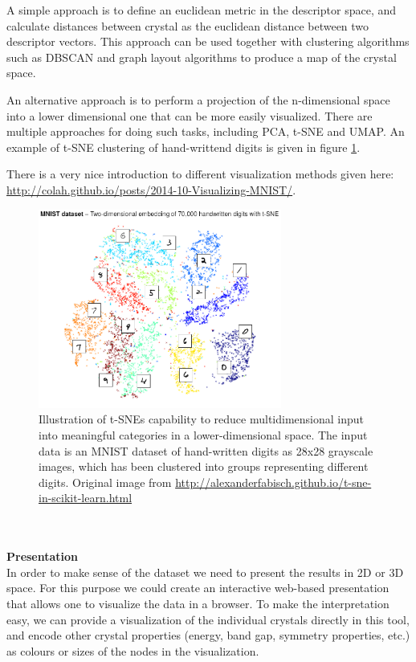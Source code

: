 \documentclass[12pt,a4paper,oneside]{article}	%
\newcommand{\+}[1]{\ensuremath{\mathbf{#1}}}		%
\begin{document}
A simple approach is to define an euclidean metric in the descriptor space, and calculate distances between crystal as the euclidean distance between two descriptor vectors. This approach can be used together with clustering algorithms such as DBSCAN\cite{dbscan} and graph layout algorithms to produce a map of the crystal space.

An alternative approach is to perform a projection of the n-dimensional space into a lower dimensional one that can be more easily visualized. There are multiple approaches for doing such tasks, including PCA\cite{pca}, t-SNE\cite{tsne} and UMAP\cite{umap}. An example of t-SNE clustering of hand-writtend digits is given in figure \ref{fig:tsne}.

There is a very nice introduction to different visualization methods given here: \url{http://colah.github.io/posts/2014-10-Visualizing-MNIST/}.
\begin{figure}[h!]
  \centering
  \includegraphics[width=8cm]{tsne.png}
  \caption{Illustration of t-SNEs capability to reduce multidimensional input into meaningful categories in a lower-dimensional space. The input data is an MNIST dataset of hand-written digits as 28x28 grayscale images, which has been clustered into groups representing different digits. Original image from \url{http://alexanderfabisch.github.io/t-sne-in-scikit-learn.html}}
  \label{fig:tsne}
\end{figure}
\\\\
\noindent\textbf{Presentation}\\
In order to make sense of the dataset we need to present the results in 2D or 3D space. For this purpose we could create an interactive web-based presentation that allows one to visualize the data in a browser. To make the interpretation easy, we can provide a visualization of the individual crystals directly in this tool, and encode other crystal properties (energy, band gap, symmetry properties, etc.) as colours or sizes of the nodes in the visualization.
\end{document}
